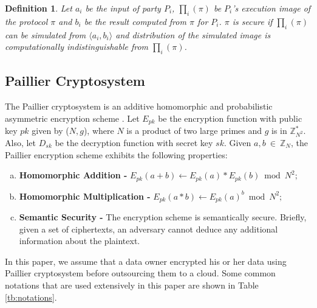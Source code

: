\documentclass{article}
\newtheorem{definition}{Definition}
\begin{document}
\begin{definition}\label{def:semi-honest}
Let $a_i$ be the input of party $P_i$, $\prod_i(\pi)$ be  $P_i$'s 
execution image of the protocol $\pi$ and $b_i$ be the result computed from $\pi$ for $P_i$.
$\pi$ is secure if $\prod_i(\pi)$ can be simulated from
$\langle a_i, b_i \rangle$ and
distribution of the simulated image is computationally indistinguishable
from $\prod_i(\pi)$.

\end{definition}

\subsection{Paillier Cryptosystem}
The Paillier cryptosystem is an additive homomorphic and probabilistic 
asymmetric encryption scheme \cite{paillier-99}. Let $E_{pk}$ be the encryption 
function with public key $pk$ given by ($N, g$), where $N$ is a product of two large primes and 
$g$ is in $\mathbb{Z}_{N^2}^*$. Also, let $D_{sk}$ be 
the decryption function with secret key $sk$. 
Given $a, b~\in~\mathbb{Z}_N$, the Paillier encryption scheme exhibits the following properties:

\begin{enumerate}[a.]
     \item \textbf{Homomorphic Addition -} $E_{pk}(a + b) \gets E_{pk}(a) \ast E_{pk}(b) \bmod N^2;$
     \item \textbf{Homomorphic Multiplication -} $E_{pk}(a\ast b) \gets E_{pk}(a)^{b} \bmod N^2;$
     \item \textbf{Semantic Security -} The encryption scheme is semantically 
secure\cite{goldwasser-89,Goldreichnc}. Briefly, given a set of ciphertexts, an 
adversary cannot deduce any additional information about the plaintext. 
\end{enumerate}
In this paper, we assume that a data owner encrypted his or her data using 
Paillier cryptosystem before outsourcing them to a cloud. Some common 
notations that are used extensively in this paper are shown in Table \ref{tb:notations}.
\end{document}
